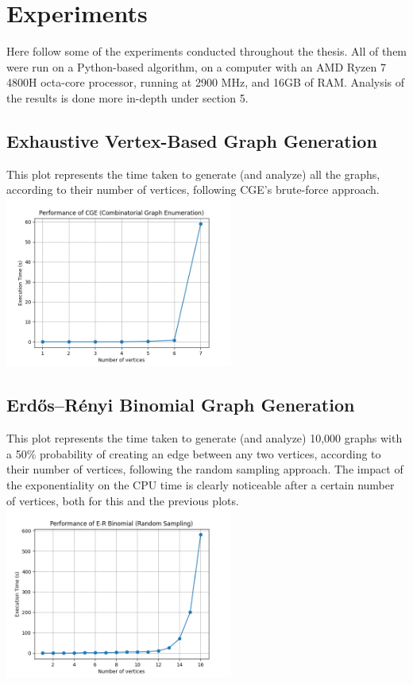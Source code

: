 \section{Experiments}
Here follow some of the experiments conducted throughout the thesis. All of them were run on a Python-based algorithm, on a computer with an AMD Ryzen 7 4800H octa-core processor, running at 2900 MHz, and 16GB of RAM. Analysis of the results is done more in-depth under section 5.

\subsection{Exhaustive Vertex-Based Graph Generation}
This plot represents the time taken to generate (and analyze) all the graphs, according to their number of vertices, following CGE's brute-force approach.
\includegraphics[width=7.5cm]{images/cge_testing.png}

\subsection{Erdős–Rényi Binomial Graph Generation}
This plot represents the time taken to generate (and analyze) 10,000 graphs with a 50\% probability of creating an edge between any two vertices, according to their number of vertices, following the random sampling approach. The impact of the exponentiality on the CPU time is clearly noticeable after a certain number of vertices, both for this and the previous plots. 
\includegraphics[width=7.5cm]{images/rnd_testing_16.png}

